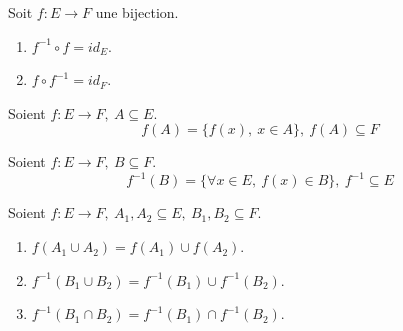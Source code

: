 \begin{proposition}
	Soit $f : E \to F$ une bijection.
    \begin{multicols}{2}
        \begin{enumerate}
            \item $f^{-1} \circ f = id_E$.
            \item $f \circ f^{-1} = id_F$.
        \end{enumerate}
    \end{multicols}
\end{proposition}

\begin{definition}
    Soient $f : E \to F,\ A \subseteq E$.
	\[ f(A) = \{ f(x),\ x \in A \},\ f(A) \subseteq F \]
\end{definition}

\begin{definition}
	Soient $f : E \to F,\ B \subseteq F$.
	\[ f^{-1}(B) = \{ \forall x \in E,\ f(x) \in B \},\ f^{-1} \subseteq E \]
\end{definition}

\begin{proposition}
    Soient $f : E \to F,\ A_1, A_2 \subseteq E,\ B_1, B_2 \subseteq F$.
    \begin{enumerate}
        \item $f(A_1 \cup A_2) = f(A_1) \cup f(A_2)$.
        \item $f^{-1} (B_1 \cup B_2) = f^{-1} (B_1) \cup f^{-1} (B_2)$.
        \item $f^{-1} (B_1 \cap B_2) = f^{-1} (B_1) \cap f^{-1} (B_2)$.
    \end{enumerate}
\end{proposition} 

